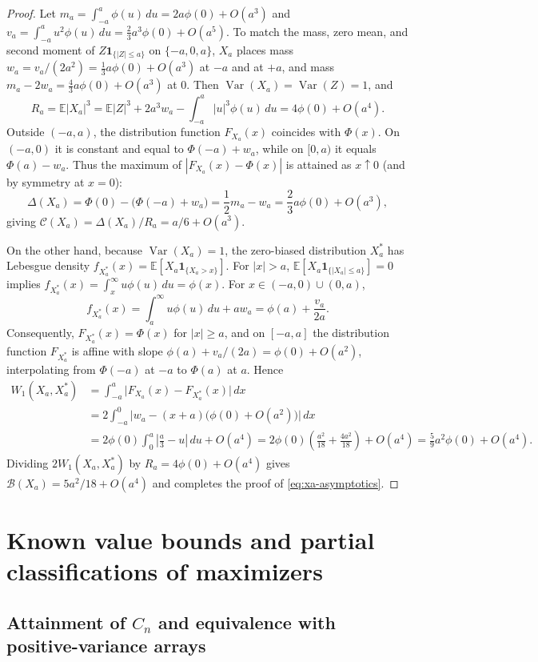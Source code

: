 \documentclass[11pt]{article}
\numberwithin{equation}{section}
\theoremstyle{definition}
\theoremstyle{remark}
\DeclareMathOperator{\Var}{Var}
\newcommand{\E}{\mathbb E}
\newcommand{\ind}{\mathbf1}
\newcommand{\phz}{\phi(0)}
\begin{document}
\begin{proof}
Let $m_a=\int_{-a}^a\phi(u)\,du=2a\phz+O(a^3)$ and
$v_a=\int_{-a}^a u^2\phi(u)\,du=\frac23 a^3\phz+O(a^5)$. To match the mass,
zero mean, and second moment of $Z\ind_{\{|Z|\le a\}}$ on $\{-a,0,a\}$, $X_a$
places mass $w_a=v_a/(2a^2)=\frac13 a\phz+O(a^3)$ at $-a$ and at $+a$, and
mass $m_a-2w_a=\frac43 a\phz+O(a^3)$ at $0$. Then $\Var(X_a)=\Var(Z)=1$, and
\[
 R_a=\E|X_a|^3=\E|Z|^3+2a^3 w_a-\int_{-a}^a|u|^3\phi(u)\,du
 =4\phz+O(a^4).
\]
Outside $(-a,a)$, the distribution function $F_{X_a}(x)$ coincides with
$\Phi(x)$. On $(-a,0)$ it is constant and equal to $\Phi(-a)+w_a$, while on
$[0,a)$ it equals $\Phi(a)-w_a$. Thus the maximum of $|F_{X_a}(x)-\Phi(x)|$ is
attained as $x\uparrow0$ (and by symmetry at $x=0$):
\[
 \Delta(X_a)=\Phi(0)-\bigl(\Phi(-a)+w_a\bigr)
 =\frac12 m_a-w_a=\frac23 a\phz+O(a^3),
\]
giving $\mathcal C(X_a)=\Delta(X_a)/R_a=a/6+O(a^3)$.

On the other hand, because $\Var(X_a)=1$, the zero-biased distribution
$X_a^*$ has Lebesgue density $f_{X_a^*}(x)=\E[X_a\ind_{\{X_a>x\}}]$. For
$|x|>a$, $\E[X_a\ind_{\{|X_a|\le a\}}]=0$ implies
$f_{X_a^*}(x)=\int_x^\infty u\phi(u)\,du=\phi(x)$. For $x\in(-a,0)\cup(0,a)$,
\[
 f_{X_a^*}(x)=\int_a^\infty u\phi(u)\,du+a w_a=\phi(a)+\frac{v_a}{2a}.
\]
Consequently, $F_{X_a^*}(x)=\Phi(x)$ for $|x|\ge a$, and on $[-a,a]$ the
distribution function $F_{X_a^*}$ is affine with slope
$\phi(a)+v_a/(2a)=\phz+O(a^2)$, interpolating from $\Phi(-a)$ at $-a$ to
$\Phi(a)$ at $a$. Hence
\begin{align*}
 W_1(X_a,X_a^*)&=\int_{-a}^a\bigl|F_{X_a}(x)-F_{X_a^*}(x)\bigr|\,dx\\
 &=2\int_{-a}^0\bigl|w_a-(x+a)\bigl(\phz+O(a^2)\bigr)\bigr|\,dx\\
 &=2\phz\int_0^a\left|\frac{a}{3}-u\right|\,du+O(a^4)
 =2\phz\left(\frac{a^2}{18}+\frac{4a^2}{18}\right)+O(a^4)
 =\frac59 a^2\phz+O(a^4).
\end{align*}
Dividing $2W_1(X_a,X_a^*)$ by $R_a=4\phz+O(a^4)$ gives
$\mathcal B(X_a)=5a^2/18+O(a^4)$ and completes the proof of
\eqref{eq:xa-asymptotics}.
\end{proof}

\section{Known value bounds and partial classifications of maximizers}\label{sec:known}

\subsection{Attainment of $C_n$ and equivalence with positive-variance arrays}\label{subsec:attainment}
\end{document}

